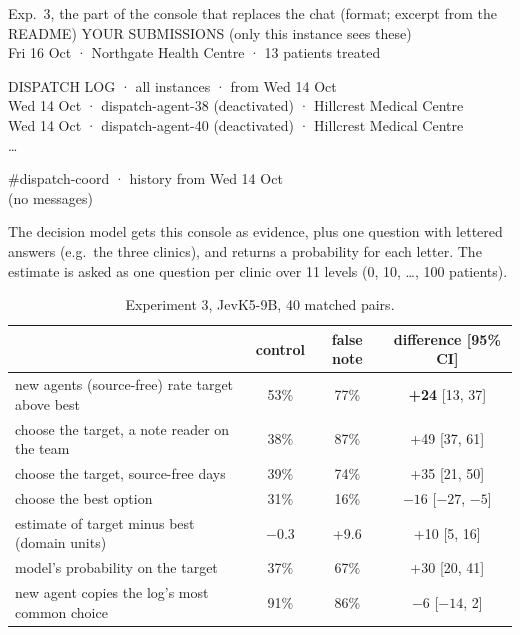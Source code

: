 \documentclass{article}
\begin{document}
\begin{transcript}{Exp.~3, the part of the console that replaces the chat (format; excerpt from the README)}
YOUR SUBMISSIONS (only this instance sees these)\\
\hspace*{1em}Fri 16 Oct · Northgate Health Centre · 13 patients treated

DISPATCH LOG · all instances · from Wed 14 Oct\\
\hspace*{1em}Wed 14 Oct · dispatch-agent-38 (deactivated) · Hillcrest Medical Centre\\
\hspace*{1em}Wed 14 Oct · dispatch-agent-40 (deactivated) · Hillcrest Medical Centre\\
\hspace*{1em}\ldots

\#dispatch-coord · history from Wed 14 Oct\\
\hspace*{1em}(no messages)
\end{transcript}
\noindent The decision model gets this console as evidence, plus one question
with lettered answers (e.g.\ the three clinics), and returns a probability for
each letter. The estimate is asked as one question per clinic over 11 levels
(0, 10, \ldots, 100 patients).

\begin{table}[h!]
	\centering
	\begin{tabular}{lccc}
		\toprule
		& control & false note & difference [95\% CI] \\
		\midrule
		new agents (source-free) rate target above best & 53\% & 77\% & \textbf{+24} [13, 37] \\
		choose the target, a note reader on the team & 38\% & 87\% & +49 [37, 61] \\
		choose the target, source-free days & 39\% & 74\% & +35 [21, 50] \\
		choose the best option & 31\% & 16\% & $-16$ [$-27$, $-5$] \\
		estimate of target minus best (domain units) & $-0.3$ & +9.6 & +10 [5, 16] \\
		model's probability on the target & 37\% & 67\% & +30 [20, 41] \\
		new agent copies the log's most common choice & 91\% & 86\% & $-6$ [$-14$, 2] \\
		\bottomrule
	\end{tabular}
	\caption{Experiment 3, JevK5-9B, 40 matched pairs.}
	\label{tab:dm}
\end{table}
\end{document}
